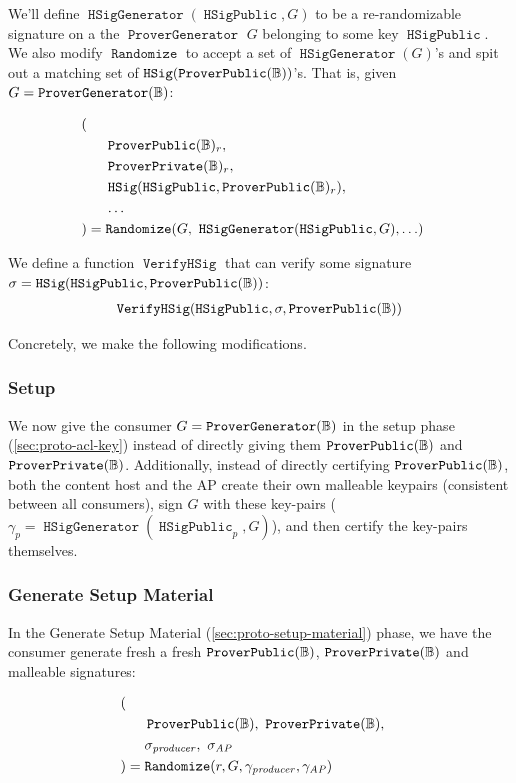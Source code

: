 \documentclass[pdftex,12pt,a4papaer,twoside,notitlepage]{report}
\DeclareMathOperator{\vh}{\mathtt{VerifyHSig}}
\DeclareMathOperator{\Hsig}{\mathtt{HSig}}
\DeclareMathOperator{\PvecG}{\mathtt{ProverGenerator}}
\DeclareMathOperator{\Hp}{\mathtt{HSigPublic}}
\DeclareMathOperator{\HsigG}{\mathtt{HSigGenerator}}
\DeclareMathOperator{\rand}{\mathtt{Randomize}}
\begin{document}
We'll define $\HsigG(\Hp, G)$ to be a re-randomizable signature on a the
$\PvecG$ $G$ belonging to some key $\Hp$. We also modify $\rand$ to accept a set
of $\HsigG(G)$'s and spit out a matching set of $\Hsig(\Pv)$'s. That is, given
$G =\Pvg$: \vspace{-3em}
\begin{singlespace}
\begin{align*}
  ( \\
    &~~~~\Pv_r,  \\
    &~~~~\Sv_r, \\
    &~~~~\Hsig(\Hp, \Pv_r),\\
    &~~~~\ldots \\
  ) &= \rand(G,~\HsigG(\Hp, G), \ldots)
\end{align*}
\end{singlespace}

We define a function $\vh$ that can verify some signature $\sigma = \Hsig(\Hp, \Pv)$:
\begin{align*}
  \vh(\Hp, \sigma, \Pv)
\end{align*}

Concretely, we make the following modifications.

\subsubsection{Setup}

We now give the consumer $G = \Pvg$ in the setup phase
(\cref{sec:proto-acl-key}) instead of directly giving them $\operatorname{\mathtt{ProverPublic}}(\mathbb{B})$ and $\operatorname{\mathtt{ProverPrivate}}(\mathbb{B})$.
Additionally, instead of directly certifying $\operatorname{\mathtt{ProverPublic}}(\mathbb{B})$, both the content host and
the AP create their own malleable keypairs (consistent between all consumers),
sign $G$ with these key-pairs ($\gamma_p = \HsigG(\Hp_p, G)$), and then certify
the key-pairs themselves.

\subsubsection{Generate Setup Material}

In the Generate Setup Material (\cref{sec:proto-setup-material}) phase, we have
the consumer generate fresh a fresh $\operatorname{\mathtt{ProverPublic}}(\mathbb{B})$, $\operatorname{\mathtt{ProverPrivate}}(\mathbb{B})$ and malleable signatures:
\vspace{-3em}
\begin{singlespace}
\begin{align*}
  ( \\
    &~~~~\Pv,~\Sv, \\
    &~~~~\sigma_{\mathit{producer}},~\sigma_{\mathit{AP}} \\
  ) &= \rand( r,  G,  \gamma_{\mathit{producer}},\gamma_{\mathit{AP}})
\end{align*}
\end{singlespace}
\end{document}
